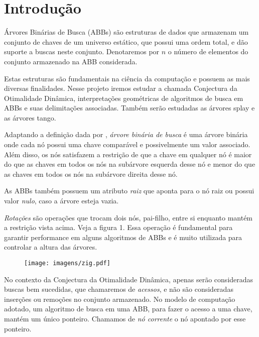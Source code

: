 
\chapter{Introdução}
\label{cap:introducao}

Árvores Binárias de Busca (ABBs) são estruturas de dados que armazenam um conjunto de chaves de um universo estático, que possui uma ordem total, e dão suporte a buscas neste conjunto. Denotaremos por $n$ o número de elementos do conjunto armazenado na ABB considerada.

Estas estruturas são fundamentais na ciência da computação e possuem as mais diversas finalidades. Nesse projeto iremos estudar a chamada Conjectura da Otimalidade Dinâmica, interpretações geométricas de algoritmos de busca em ABBs e suas delimitações associadas. Também serão estudadas as árvores splay e as árvores tango.

Adaptando a definição dada por \cite{Sedgewick}, \textit{árvore binária de busca} é uma árvore binária onde cada nó possui uma chave comparável e possivelmente um valor associado. Além disso, os nós satisfazem a restrição de que a chave em qualquer nó é maior do que as chaves em todos os nós na subárvore esquerda desse nó e menor do que as chaves em todos os nós na subárvore direita desse nó.

As ABBs também possuem um atributo \textit{raiz} que aponta para o nó raiz ou possui valor \textit{nulo}, caso a árvore esteja vazia.

\textit{Rotações} são operações que trocam dois nós, pai-filho, entre si enquanto mantém a restrição vista acima. Veja a figura 1. Essa operação é fundamental para garantir performance em alguns algoritmos de ABBs e é muito utilizada para controlar a altura das árvores.


\begin{figure}[htbp]
    \centering
    \texttt{[image: imagens/zig.pdf]}
    \label{fig:imagem}
\end{figure}

No contexto da Conjectura da Otimalidade Dinâmica, apenas serão consideradas buscas bem sucedidas, que chamaremos de \textit{acessos}, e não são consideradas inserções ou remoções no conjunto armazenado. No modelo de computação adotado, um algoritmo de busca em uma ABB, para fazer o acesso a uma chave, mantém um único ponteiro. Chamamos de \textit{nó corrente} o nó apontado por esse ponteiro. 

